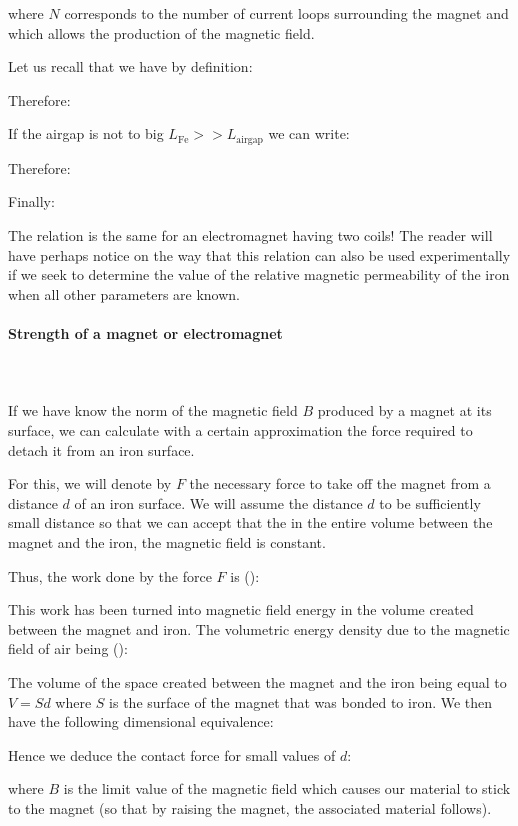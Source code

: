 	where $N$ corresponds to the number of current loops surrounding the magnet and which allows the production of the magnetic field.
	
	Let us recall that we have by definition:
	
	Therefore:
	
	If the airgap is not to big $L_\text{Fe}>>L_\text{airgap}$ we can write:
	
	Therefore:
	
	Finally:
	
	The relation is the same for an electromagnet having two coils! The reader will have perhaps notice on the way that this relation can also be used experimentally if we seek to determine the value of the relative magnetic permeability of the iron when all other parameters are known.
	
	\paragraph{Strength of a magnet or electromagnet}\mbox{}\\\\
	If we have know the norm of the magnetic field $B$ produced by a magnet at its surface, we can calculate with a certain approximation the force required to detach it from an iron surface.
	
	For this, we will denote by $F$ the necessary force to take off the magnet from a distance $d$ of an iron surface. We will assume the distance $d$ to be sufficiently small distance so that we can accept that the in the entire volume between the magnet and the iron, the magnetic field is constant.
	
	Thus, the work done by the force $F$ is ():
	
	This work has been turned into magnetic field energy in the volume created between the magnet and iron. The volumetric energy density due to the magnetic field of air being ():
	
	The volume of the space created between the magnet and the iron being equal to $V=Sd$ where $S$ is the surface of the magnet that was bonded to iron. We then have the following dimensional equivalence:
	
	Hence we deduce the contact force for small values of $d$:
	
	where $B$ is the limit value of the magnetic field which causes our material to stick to the magnet (so that by raising the magnet, the associated material follows).
	
